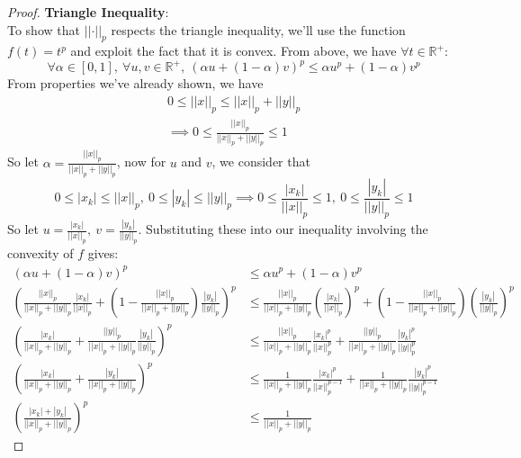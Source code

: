 \documentclass{article}
\newcommand{\norm}[1]{\left|\left|#1\right|\right|}
\newcommand{\abs}[1]{\left|#1\right|}
\newcommand{\parens}[1]{\left(#1\right)}
\newcommand{\R}{\mathbb{R}}
\begin{document}
\begin{proof}
    \textbf{Triangle Inequality}:\\
    To show that $\norm{\cdot}_p$ respects the triangle inequality,
    we'll use the function $f(t) = t^p$ and 
    exploit the fact that it is convex. From above, we have
    $\forall t\in \R^+$:
    $$\forall \alpha \in [0,1],\ \forall u,v \in \R^+,\ 
    \parens{\alpha u + (1- \alpha)v}^p \leq \alpha u^p + 
    (1-\alpha)v^p$$
    From properties we've already shown, we have
    \begin{gather*}
    0 \leq \norm{x}_p \leq \norm{x}_p + \norm{y}_p \\
    \implies 0 \leq \frac{\norm{x}_p}{\norm{x}_p + \norm{y}_p} \leq 1
    \end{gather*}
    So let $\alpha = \frac{\norm{x}_p}{\norm{x}_p + \norm{y}_p}$, now 
    for $u$ and $v$, we consider that
    $$0 \leq \abs{x_k} \leq \norm{x}_p,\  
    0 \leq \abs{y_k} \leq \norm{y}_p  
    \implies 0 \leq \frac{\abs{x_k}}{\norm{x}_p} \leq 1,\ 
    0 \leq \frac{\abs{y_k}}{\norm{y}_p} \leq 1$$
    So let $u = \frac{\abs{x_k}}{\norm{x}_p},\ 
    v = \frac{\abs{y_k}}{\norm{y}_p}$. Substituting these into our 
    inequality involving the convexity of $f$ gives:
    \begin{align*}
    \parens{\alpha u + (1- \alpha)v}^p &\leq \alpha u^p + 
    (1-\alpha)v^p \\
    \parens{\frac{\norm{x}_p}{\norm{x}_p + \norm{y}_p} 
    \frac{\abs{x_k}}{\norm{x}_p} + \parens{1- \frac{\norm{x}_p}
    {\norm{x}_p + \norm{y}_p}}\frac{\abs{y_k}}{\norm{y}_p}}^p 
    &\leq \frac{\norm{x}_p}{\norm{x}_p + \norm{y}_p} \parens{
    \frac{\abs{x_k}}{\norm{x}_p}}^p + 
    \parens{1-\frac{\norm{x}_p}{\norm{x}_p + \norm{y}_p}}\parens{
    \frac{\abs{y_k}}{\norm{y}_p}}^p \\
    \parens{\frac{\abs{x_k}}{\norm{x}_p + \norm{y}_p} 
    + \frac{\norm{y}_p}
    {\norm{x}_p + \norm{y}_p}\frac{\abs{y_k}}{\norm{y}_p}}^p 
    &\leq \frac{\norm{x}_p}{\norm{x}_p + \norm{y}_p}
    \frac{\abs{x_k}^p}{\norm{x}_p^p} + 
    \frac{\norm{y}_p}{\norm{x}_p + \norm{y}_p}
    \frac{\abs{y_k}^p}{\norm{y}_p^p} \\
    \parens{\frac{\abs{x_k}}{\norm{x}_p + \norm{y}_p} 
    + \frac{\abs{y_k}}
    {\norm{x}_p + \norm{y}_p}}^p 
    &\leq \frac{1}{\norm{x}_p + \norm{y}_p}
    \frac{\abs{x_k}^p}{\norm{x}_p^{p-1}} + 
    \frac{1}{\norm{x}_p + \norm{y}_p}
    \frac{\abs{y_k}^p}{\norm{y}_p^{p-1}} \\
    \parens{\frac{\abs{x_k} + \abs{y_k}}{\norm{x}_p + \norm{y}_p}}^p 
    &\leq \frac{1}{\norm{x}_p + \norm{y}_p}

\end{align*}
\end{proof}
\end{document}
